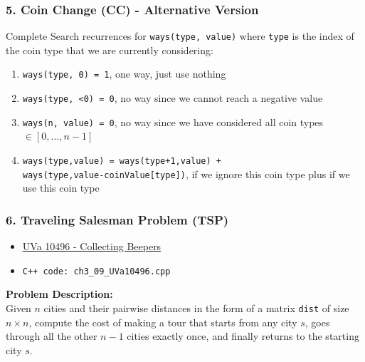 \documentclass{beamer}
\begin{document}
\begin{frame}[fragile]
\frametitle{5. Coin Change (CC) - Alternative Version}

Complete Search recurrences for \verb|ways(type, value)| where \verb|type| is the index of the coin type that we are currently considering:

\begin{enumerate}
    \item \color{blue}\verb|ways(type, 0) = 1|\color{black}, one way, just use nothing
    \item \color{blue}\verb|ways(type, <0) = 0|\color{black}, no way since we cannot reach a negative value    
    \item \color{blue}\verb|ways(n, value) = 0|\color{black}, no way since we have considered all coin types $\in [0,\ldots,n-1]$
    \item \color{blue}\verb|ways(type,value) = ways(type+1,value) + | \\ \verb|ways(type,value-coinValue[type])|\color{black}, if we ignore this coin type plus if we use this coin type
\end{enumerate}

\end{frame}


\begin{frame}[fragile]
\frametitle{6. Traveling Salesman Problem (TSP)}

\begin{itemize}
    \item \href{https://onlinejudge.org/index.php?option=com_onlinejudge&Itemid=8&category=16&page=show_problem&problem=1437}{UVa 10496 - Collecting Beepers}
    \item \color{red}\verb|C++ code: ch3_09_UVa10496.cpp|\color{black}
\end{itemize} 

\vspace{0.3cm}

\color{red}\textbf{Problem Description: }\color{black} \\ 

Given $n$ cities and their pairwise distances in the form of a matrix \verb|dist| of size $n \times n$, compute the cost of making a tour that starts from any city $s$, goes through all the other $n-1$ cities exactly once, and finally returns to the starting city $s$.

\end{frame}
\end{document}
